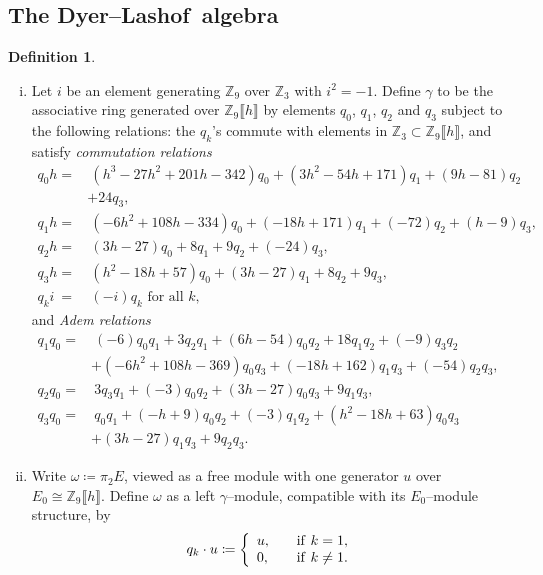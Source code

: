 \documentclass[microtype]{gtpart}     %
\theoremstyle{remark}
\theoremstyle{definition}
\newtheorem{defn}{Definition}[section]
\newcommand{\mb}[1]{\mathbb{#1}}
\newcommand{\DL}{Dyer--Lashof~}
\newcommand{\BZ}{{\mb Z}}
\newcommand{\ce}{\coloneqq}
\newcommand{\g}{\gamma}
\begin{document}
\subsection{The \DL algebra}

\begin{defn}
\label{def:go}
 \mbox{}
 \begin{enumerate}[(i)]
  \item \label{go(i)} Let $i$ be an element generating $\BZ_9$ over $\BZ_3$ 
  with $i^2 = -1$.  Define $\g$ to be the associative ring generated over 
  $\BZ_9 \llbracket h \rrbracket$ by elements $q_0$, $q_1$, $q_2$ and $q_3$ 
  subject to the following relations: the $q_k$'s commute with elements in 
  $\BZ_3 \subset \BZ_9 \llbracket h \rrbracket$, and satisfy {\em commutation 
  relations} 
  \begin{equation*}
  \begin{split}
   q_0 h = & ~ (h^3 - 27 h^2 + 201 h - 342) q_0 + (3 h^2 - 54 h + 171) q_1 + (9 h - 81) q_2 \\
           & + 24 q_3, \\
   q_1 h = & ~ (-6 h^2 + 108 h - 334) q_0 + (-18 h + 171) q_1 + (-72) q_2 + (h - 9) q_3, \\
   q_2 h = & ~ (3 h - 27) q_0 + 8 q_1 + 9 q_2 + (-24) q_3, \\
   q_3 h = & ~ (h^2 - 18 h + 57) q_0 + (3 h - 27) q_1 + 8 q_2 + 9 q_3, \\
   q_k i ~ = & ~ (-i) q_k \text{~for all~} k, 
  \end{split}
  \end{equation*}
  and {\em Adem relations} 
  \begin{equation*}
  \begin{split}
   q_1q_0 = & ~ (-6) q_0q_1 + 3 q_2q_1 + (6 h - 54) q_0q_2 + 18 q_1q_2 + (-9) q_3q_2 \\
            & + (-6 h^2 + 108 h - 369) q_0q_3 + (-18 h + 162) q_1q_3 + (-54) q_2q_3, \quad~~ \\
   q_2q_0 = & ~ 3 q_3q_1 + (-3) q_0q_2 + (3 h - 27) q_0q_3 + 9 q_1q_3, \\
   q_3q_0 = & ~ q_0q_1 + (-h + 9) q_0q_2 + (-3) q_1q_2 + (h^2 - 18 h + 63) q_0q_3 \\
            & + (3 h - 27) q_1q_3 + 9 q_2q_3.  
  \end{split}
  \end{equation*}

  \item \label{go(ii)} Write $\omega \ce \pi_2 E$, viewed as a free module 
  with one generator $u$ over $E_0 \cong \BZ_9 \llbracket h \rrbracket$.  
  Define $\omega$ as a left $\g$--module, compatible with its $E_0$--module 
  structure, by 
  \[
   q_k \cdot u \ce \left\{
   \begin{array}{ll}
     u,  & \quad {\rm if}~k = 1, \\
     0,  & \quad {\rm if}~k \neq 1.  
   \end{array}
   \right.
  \]
 \end{enumerate}
\end{defn}
\end{document}
